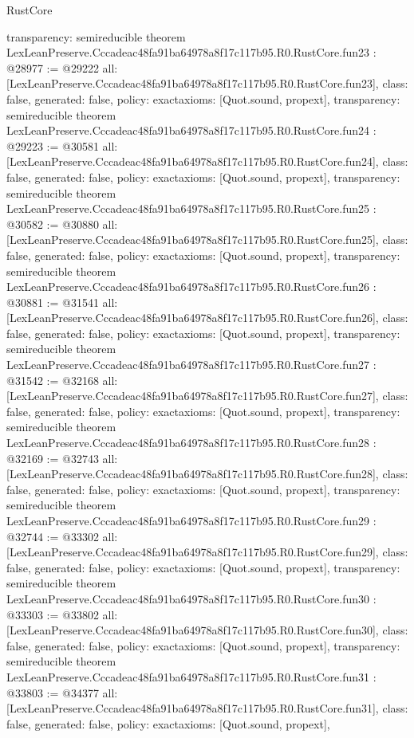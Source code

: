 \begin{lexlean}{RustCore}
\begin{coremodule}
{  transparency: semireducible
}
theorem LexLeanPreserve.Cccadeac48fa91ba64978a8f17c117b95.R0.RustCore.fun23 : @28977 := @29222 {
  all: [LexLeanPreserve.Cccadeac48fa91ba64978a8f17c117b95.R0.RustCore.fun23],
  class: false,
  generated: false,
  policy: exact{axioms: [Quot.sound, propext]},
  transparency: semireducible
}
theorem LexLeanPreserve.Cccadeac48fa91ba64978a8f17c117b95.R0.RustCore.fun24 : @29223 := @30581 {
  all: [LexLeanPreserve.Cccadeac48fa91ba64978a8f17c117b95.R0.RustCore.fun24],
  class: false,
  generated: false,
  policy: exact{axioms: [Quot.sound, propext]},
  transparency: semireducible
}
theorem LexLeanPreserve.Cccadeac48fa91ba64978a8f17c117b95.R0.RustCore.fun25 : @30582 := @30880 {
  all: [LexLeanPreserve.Cccadeac48fa91ba64978a8f17c117b95.R0.RustCore.fun25],
  class: false,
  generated: false,
  policy: exact{axioms: [Quot.sound, propext]},
  transparency: semireducible
}
theorem LexLeanPreserve.Cccadeac48fa91ba64978a8f17c117b95.R0.RustCore.fun26 : @30881 := @31541 {
  all: [LexLeanPreserve.Cccadeac48fa91ba64978a8f17c117b95.R0.RustCore.fun26],
  class: false,
  generated: false,
  policy: exact{axioms: [Quot.sound, propext]},
  transparency: semireducible
}
theorem LexLeanPreserve.Cccadeac48fa91ba64978a8f17c117b95.R0.RustCore.fun27 : @31542 := @32168 {
  all: [LexLeanPreserve.Cccadeac48fa91ba64978a8f17c117b95.R0.RustCore.fun27],
  class: false,
  generated: false,
  policy: exact{axioms: [Quot.sound, propext]},
  transparency: semireducible
}
theorem LexLeanPreserve.Cccadeac48fa91ba64978a8f17c117b95.R0.RustCore.fun28 : @32169 := @32743 {
  all: [LexLeanPreserve.Cccadeac48fa91ba64978a8f17c117b95.R0.RustCore.fun28],
  class: false,
  generated: false,
  policy: exact{axioms: [Quot.sound, propext]},
  transparency: semireducible
}
theorem LexLeanPreserve.Cccadeac48fa91ba64978a8f17c117b95.R0.RustCore.fun29 : @32744 := @33302 {
  all: [LexLeanPreserve.Cccadeac48fa91ba64978a8f17c117b95.R0.RustCore.fun29],
  class: false,
  generated: false,
  policy: exact{axioms: [Quot.sound, propext]},
  transparency: semireducible
}
theorem LexLeanPreserve.Cccadeac48fa91ba64978a8f17c117b95.R0.RustCore.fun30 : @33303 := @33802 {
  all: [LexLeanPreserve.Cccadeac48fa91ba64978a8f17c117b95.R0.RustCore.fun30],
  class: false,
  generated: false,
  policy: exact{axioms: [Quot.sound, propext]},
  transparency: semireducible
}
theorem LexLeanPreserve.Cccadeac48fa91ba64978a8f17c117b95.R0.RustCore.fun31 : @33803 := @34377 {
  all: [LexLeanPreserve.Cccadeac48fa91ba64978a8f17c117b95.R0.RustCore.fun31],
  class: false,
  generated: false,
  policy: exact{axioms: [Quot.sound, propext]},
}
\end{coremodule}
\end{lexlean}
